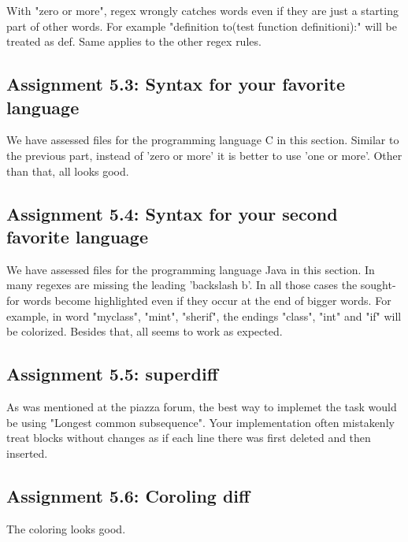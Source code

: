 \documentclass[a4paper]{article}
\begin{document}
With "zero or more", regex wrongly catches words even if they are just a starting part of other words. For example "definition to(test function definitioni):" will be treated as def. Same applies to the other regex rules.

\subsection*{Assignment 5.3: Syntax for your favorite language}
We have assessed files for the programming language C in this section. Similar to the previous part, instead of 'zero or more' it is better to use 'one or more'. Other than that, all looks good.

\subsection*{Assignment 5.4:  Syntax for your second favorite language}
We have assessed files for the programming language Java in this section. In many regexes are missing the leading 'backslash b'. In all those cases the sought-for words become highlighted even if they occur at the end of bigger words. For example, in word "myclass", "mint", "sherif", the endings "class", "int" and "if" will be colorized. Besides that, all seems to work as expected.

\subsection*{Assignment 5.5: superdiff}
As was mentioned at the piazza forum, the best way to implemet the task would be using "Longest common subsequence". Your implementation often mistakenly treat blocks without changes as if each line there was first deleted and then inserted.

\subsection*{Assignment 5.6: Coroling diff}

The coloring looks good.



\end{document}
